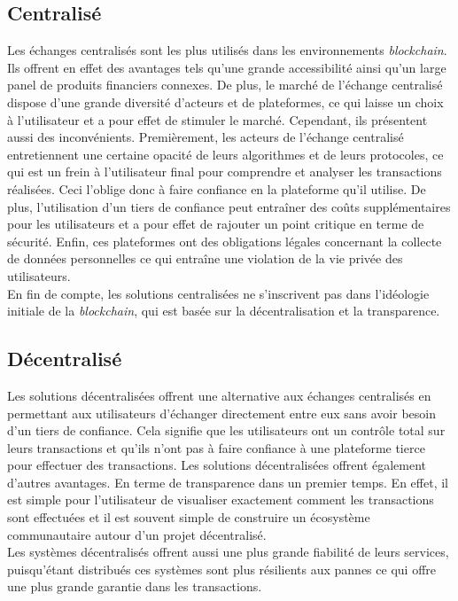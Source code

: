 \subsection{Centralisé} 
Les échanges centralisés sont les plus utilisés dans les environnements \textit{\gls{blockchain}}. Ils offrent en effet
des avantages tels qu'une grande accessibilité ainsi qu'un large panel de produits financiers connexes.
De plus, le marché de l'échange centralisé dispose d'une grande diversité d'acteurs et de plateformes, ce
qui laisse un choix à l'utilisateur et a pour effet de stimuler le marché. 
Cependant, ils présentent aussi des inconvénients. Premièrement, les acteurs de l'échange centralisé entretiennent une certaine opacité 
de leurs algorithmes et  de leurs protocoles, ce qui est un frein à l'utilisateur final pour comprendre et analyser 
les transactions réalisées. Ceci l'oblige donc à faire confiance en la plateforme qu'il utilise. 
De plus, l’utilisation d’un tiers de confiance peut entraîner des coûts supplémentaires pour 
les utilisateurs et a pour effet de rajouter un point critique en terme de sécurité. Enfin, ces plateformes ont 
des obligations légales concernant la collecte de données personnelles ce qui entraîne une violation de la vie 
privée des utilisateurs. \\
En fin de compte, les solutions centralisées ne s’inscrivent pas dans l’idéologie initiale de la \textit{blockchain}, qui est 
basée sur la décentralisation et la transparence.

\subsection{Décentralisé}
Les solutions décentralisées offrent une alternative aux échanges centralisés en permettant aux utilisateurs 
d’échanger directement entre eux sans avoir besoin d’un tiers de confiance. Cela signifie que les utilisateurs 
ont un contrôle total sur leurs transactions et qu’ils n’ont pas à faire confiance à une plateforme tierce pour 
effectuer des transactions. Les solutions décentralisées offrent également d'autres avantages. En terme de 
transparence dans un premier temps. En effet, il est simple pour l'utilisateur de visualiser exactement comment les 
transactions sont effectuées et il est souvent simple de construire un écosystème communautaire autour d'un projet
décentralisé. \\
Les systèmes décentralisés offrent aussi une plus grande fiabilité de leurs services, puisqu'étant distribués 
ces systèmes sont plus résilients aux pannes ce qui offre une plus grande garantie dans les transactions.

